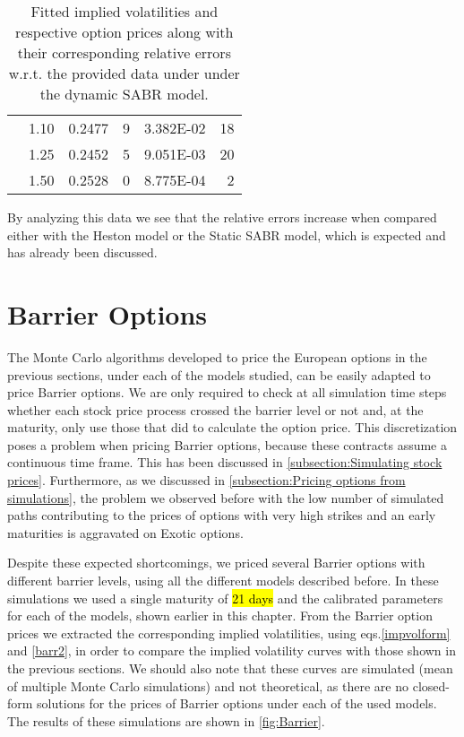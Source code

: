 \begin{table}[H]
\begin{tabular}{@{}cccrcr@{}}
 & 1.10 & 0.2477 & 9 & \num{3.382E-02} & 18 \\
 & 1.25 & 0.2452 & 5 & \num{9.051E-03} & 20 \\
 & 1.50 & 0.2528 & 0 & \num{8.775E-04} & 2 \\ \bottomrule
\end{tabular}
  \caption[Fitted implied volatilities and respective option prices along with their corresponding relative errors w.r.t. the provided data under under the dynamic SABR model.]{Fitted implied volatilities and respective option prices along with their corresponding relative errors w.r.t. the provided data under under the dynamic SABR model.}
  \label{tab:DS}
\end{table}

By analyzing this data we see that the relative errors increase when compared either with the Heston model or the Static SABR model, which is expected and has already been discussed.


\newpage


\section{Barrier Options}

The Monte Carlo algorithms developed to price the European options in the previous sections, under each of the models studied, can be easily adapted to price Barrier options.
We are only required to check at all simulation time steps whether each stock price process crossed the barrier level or not and, at the maturity, only use those that did to calculate the option price. This discretization poses a problem when pricing Barrier options, because these contracts assume a continuous time frame. This has been discussed in \autoref{subsection:Simulating stock prices}. Furthermore, as we discussed in \autoref{subsection:Pricing options from simulations}, the problem we observed before with the low number of simulated paths contributing to the prices of options with very high strikes and an early maturities is aggravated on Exotic options.

Despite these expected shortcomings, we priced several Barrier options with different barrier levels, using all the different models described before. In these simulations we used a single maturity of \hl{21 days} and the calibrated parameters for each of the models, shown earlier in this chapter. From the Barrier option prices we extracted the corresponding implied volatilities, using eqs.\eqref{impvolform} and \eqref{barr2}, in order to compare the implied volatility curves with those shown in the previous sections.
We should also note that these curves are simulated (mean of multiple Monte Carlo simulations) and not theoretical, as there are no closed-form solutions for the prices of Barrier options under each of the used models.
The results of these simulations are shown in \autoref{fig:Barrier}.

